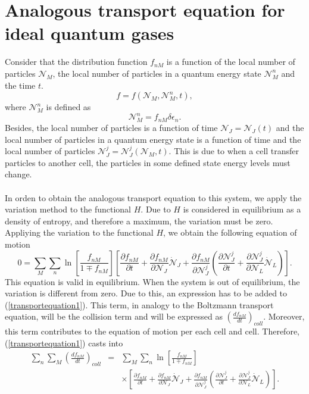 \documentclass{article}
\begin{document}
\section{Analogous transport equation for ideal quantum gases}
Consider that the distribution function $f_{nM}$ is a function of the local number of particles $\mathcal{N}_M$, the local number of particles in a quantum energy state $\mathcal{N}_{M}^{n}$ and the time $t$.
\begin{equation}
    f=f(\mathcal{N}_M,\mathcal{N}_M^{n},t),
\end{equation}
where $\mathcal{N}_{M}^{n}$ is defined as
\begin{equation}
    \mathcal{N}_{M}^{n}= f_{nM} \delta \epsilon_n.
\end{equation}
Besides, the local number of particles is a function of time $\mathcal{N}_J=\mathcal{N}_J(t)$ and the local number of particles in a quantum energy state is a function of time and the local number of particles $\mathcal{N}_J^{j}=\mathcal{N}_J^{j}(\mathcal{N}_M,t)$. This is due to when a cell transfer particles to another cell, the particles in some defined state energy levels must change.\\
\\
In orden to obtain the analogous transport equation to this system, we apply the variation method to the functional $H$. Due to $H$ is considered in equilibrium as a density of entropy, and therefore a maximum, the variation must be zero.\\
Appliying the variation to the functional $H$, we obtain the following equation of motion
\begin{equation}
    0=\sum_M \sum_n \ln \left[ \frac{f_{nM}}{1\mp f_{nM}} \right] \left[ \frac{\partial f_{nM}}{\partial t}+\frac{\partial f_{nM}}{\partial \mathcal{N}_J}\dot{\mathcal{N}}_J+\frac{\partial f_{nM}}{\partial \mathcal{N}_J^{j}}\left( \frac{\partial \mathcal{N}_J^{j}}{\partial t}+\frac{\partial \mathcal{N}_J^{j}}{\partial \mathcal{N}_L}\dot{\mathcal{N}}_L \right) \right]. \label{transportequation1}
\end{equation}
This equation is valid in equilibrium. When the system is out of equilibrium, the variation is different from zero. Due to this, an expression has to be added to (\ref{transportequation1}). This term, in analogy to the Boltzmann transport equation, will be the collision term and will be expressed as $\left( \frac{df_{nM}}{dt} \right)_{coll}$. Moreover, this term contributes to the equation of motion per each cell and cell. Therefore, (\ref{transportequation1}) casts into
\begin{eqnarray}
    \sum_n \sum_M\left( \frac{df_{nM}}{dt} \right)_{coll}&=&\sum_M \sum_n \ln \left[ \frac{f_{nM}}{1\mp f_{nM}} \right] \nonumber \\
    &&\times \left[ \frac{\partial f_{nM}}{\partial t}+\frac{\partial f_{nM}}{\partial \mathcal{N}_J}\dot{\mathcal{N}}_J+\frac{\partial f_{nM}}{\partial \mathcal{N}_J^{j}}\left( \frac{\partial \mathcal{N}_J^{j}}{\partial t}+\frac{\partial \mathcal{N}_J^{j}}{\partial \mathcal{N}_L}\dot{\mathcal{N}}_L \right) \right].  \nonumber \\ \label{transportequation2}
\end{eqnarray}
\end{document}

